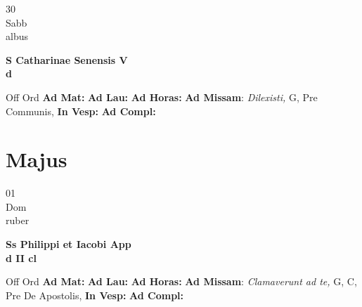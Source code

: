 \documentclass[10pt, openany]{book}
\begin{document}
        \begin{center}
            \begin{minipage}{3.5in}
                \vspace{2em}
                \begin{minipage}{0.5in}
                    {\Huge 30} \\
                    {\normalsize Sabb} \\
                    {\normalsize albus}
                \end{minipage}
                \begin{minipage}{3.0in}
                    \textbf{ \large S Catharinae Senensis V \\
                    \textnormal{\normalsize d}} \\ 
                \end{minipage}
                \begin{justify}Off Ord
                    \textbf{Ad Mat: }
                    \textbf{Ad Lau: }
                    \textbf{Ad Horas: }\textbf{Ad Missam}: \textit{Dilexisti,} G, Pre Communis,  
                    \textbf{In Vesp: }
                    \textbf{Ad Compl: }
                \end{justify}
            \end{minipage}
        \end{center}
    
        \chapter{Majus}
                        
        \begin{center}
            \begin{minipage}{3.5in}
                \vspace{2em}
                \begin{minipage}{0.5in}
                    {\Huge 01} \\
                    {\normalsize Dom} \\
                    {\normalsize ruber}
                \end{minipage}
                \begin{minipage}{3.0in}
                    \textbf{ \large Ss Philippi et Iacobi App \\
                    \textnormal{\normalsize d II cl}} \\ 
                \end{minipage}
                \begin{justify}Off Ord
                    \textbf{Ad Mat: }
                    \textbf{Ad Lau: }
                    \textbf{Ad Horas: }\textbf{Ad Missam}: \textit{Clamaverunt ad te,} G, C, Pre De Apostolis,  
                    \textbf{In Vesp: }
                    \textbf{Ad Compl: }
                \end{justify}
            \end{minipage}
        \end{center}
    
\end{document}
